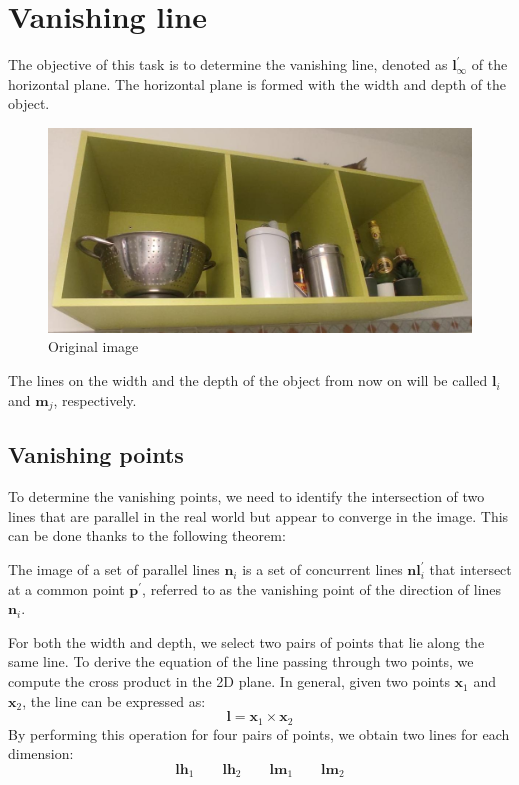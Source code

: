 \section{Vanishing line}

The objective of this task is to determine the vanishing line, denoted as $\mathbf{l}^\prime_{\infty}$ of the horizontal plane. 
The horizontal plane is formed with the width and depth of the object.
\begin{figure}[H]
    \centering
    \includegraphics[width=0.75\linewidth]{images/cropped.jpg}
    \caption{Original image}
\end{figure}
The lines on the width and the depth of the object from now on will be called $\mathbf{l}_i$ and $\mathbf{m}_j$, respectively.

\subsection{Vanishing points}
To determine the vanishing points, we need to identify the intersection of two lines that are parallel in the real world but appear to converge in the image.
This can be done thanks to the following theorem:
\begin{theorem}
    The image of a set of parallel lines $\mathbf{n}_i$ is a set of concurrent lines $\mathbf{nl}^\prime_i$ that intersect at a common point $\mathbf{p}^\prime$, referred to as the vanishing point of the direction of lines $\mathbf{n}_i$. 
\end{theorem}

For both the width and depth, we select two pairs of points that lie along the same line. 
To derive the equation of the line passing through two points, we compute the cross product in the 2D plane.
In general, given two points $\mathbf{x}_1$ and $\mathbf{x}_2$, the line can be expressed as:
\[\mathbf{l}=\mathbf{x}_1 \times \mathbf{x}_2\]
By performing this operation for four pairs of points, we obtain two lines for each dimension:
\[\mathbf{lh}_1 \qquad \mathbf{lh}_2 \qquad \mathbf{lm}_1 \qquad \mathbf{lm}_2\]

